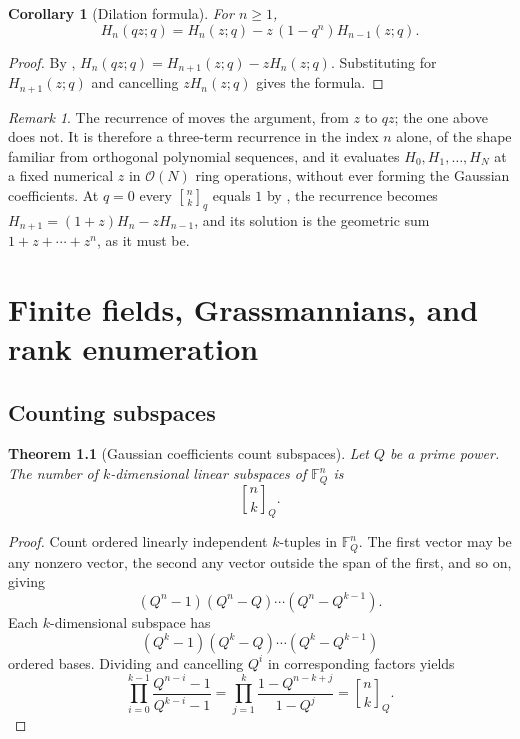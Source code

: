 \documentclass[11pt,oneside,openany]{book}
\newtheorem{theorem}{Theorem}[chapter]
\newtheorem{corollary}[corollary]{Corollary}
\theoremstyle{definition}
\theoremstyle{remark}
\newtheorem{remark}[remark]{Remark}
\newcommand{\qbinom}[2]{\genfrac{[}{]}{0pt}{}{#1}{#2}_{q}}
\newcommand{\Qbinom}[3]{\genfrac{[}{]}{0pt}{}{#1}{#2}_{#3}}
\newcommand{\F}{\mathbb F}
\newcommand{\OO}{\mathcal O}
\begin{document}
\begin{corollary}[Dilation formula]\label{cor:rogers-szego-dilation}
For $n\ge1$,
\[
 H_n(qz;q)=H_n(z;q)-z\,(1-q^n)H_{n-1}(z;q).
\]
\end{corollary}

\begin{proof}
By , $H_n(qz;q)=H_{n+1}(z;q)-zH_n(z;q)$.
Substituting  for $H_{n+1}(z;q)$ and
cancelling $zH_n(z;q)$ gives the formula.
\end{proof}

\begin{remark}\label{rem:rogers-szego-three-term}
The recurrence of  moves the argument, from
$z$ to $qz$; the one above does not.  It is therefore a three-term recurrence
in the index $n$ alone, of the shape familiar from orthogonal polynomial
sequences, and it evaluates $H_0,H_1,\ldots,H_N$ at a fixed numerical $z$ in
$\OO(N)$ ring operations, without ever forming the Gaussian coefficients.  At
$q=0$ every $\qbinom nk$ equals $1$ by ,
the recurrence becomes $H_{n+1}=(1+z)H_n-zH_{n-1}$, and its solution is the
geometric sum $1+z+\cdots+z^{n}$, as it must be.
\end{remark}

\chapter{Finite fields, Grassmannians, and rank enumeration}\label{chap:finite-geometry}

\section{Counting subspaces}

\begin{theorem}[Gaussian coefficients count subspaces]\label{thm:subspace-count}
Let $Q$ be a prime power.  The number of $k$-dimensional linear subspaces of $\F_Q^n$ is
\[
 \Qbinom nkQ.
\]
\end{theorem}

\begin{proof}
Count ordered linearly independent $k$-tuples in $\F_Q^n$.  The first vector may be any nonzero vector, the second any vector outside the span of the first, and so on, giving
\[
 (Q^n-1)(Q^n-Q)\cdots(Q^n-Q^{k-1}).
\]
Each $k$-dimensional subspace has
\[
 (Q^k-1)(Q^k-Q)\cdots(Q^k-Q^{k-1})
\]
ordered bases.  Dividing and cancelling $Q^i$ in corresponding factors yields
\[
 \prod_{i=0}^{k-1}\frac{Q^{n-i}-1}{Q^{k-i}-1}
 =\prod_{j=1}^{k}\frac{1-Q^{n-k+j}}{1-Q^j}
 =\Qbinom nkQ.
\]
\end{proof}
\end{document}
